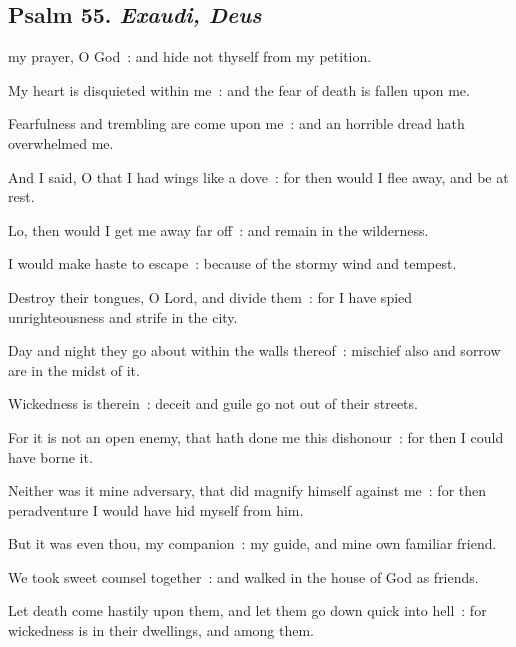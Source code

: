 \subsection{Psalm 55. \textit{Exaudi, Deus}}


 my prayer, O God~: and hide not thyself from my petition.\par
{}
My heart is disquieted within me~: and the fear of death is fallen upon me.\par
{}Fearfulness and trembling are come upon me~: and an horrible dread hath overwhelmed me.\par
{}And I said, O that I had wings like a dove~: for then would I flee away, and be at rest.\par
{}Lo, then would I get me away far off~: and remain in the wilderness.\par
{}I would make haste to escape~: because of the stormy wind and tempest.\par
{}Destroy their tongues, O Lord, and divide them~: for I have spied unrighteousness and strife in the city.\par
{}Day and night they go about within the walls thereof~: mischief also and sorrow are in the midst of it.\par
{}Wickedness is therein~: deceit and guile go not out of their streets.\par
{}For it is not an open enemy, that hath done me this dishonour~: for then I could have borne it.\par
{}Neither was it mine adversary, that did magnify himself against me~: for then peradventure I would have hid myself from him.\par
{}But it was even thou, my companion~: my guide, and mine own familiar friend.\par
{}We took sweet counsel together~: and walked in the house of God as friends.\par
{}Let death come hastily upon them, and let them go down quick into hell~: for wickedness is in their dwellings, and among them.\par
